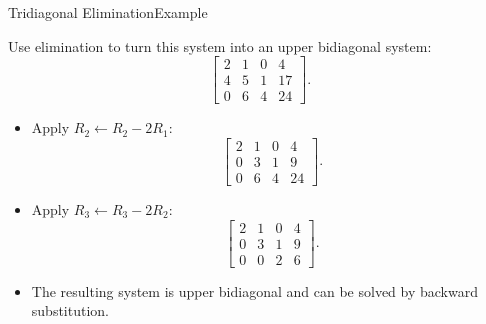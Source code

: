 \documentclass[10pt]{beamer}
\begin{document}
\begin{frame}{Tridiagonal Elimination}{Example}

\begin{example}
Use elimination to turn this system into an
upper bidiagonal system:
\[
\left[
\begin{array}{rrr|r}
    2&1&0&4\\
    4&5&1&17\\
    0&6&4&24
\end{array}
\right].
\]
\end{example}

\begin{itemize}
    \item<2-> Apply $R_2\leftarrow R_2-2R_1$:
    \[
    \left[
    \begin{array}{rrr|r}
        2&1&0&4\\
        0&3&1&9\\
        0&6&4&24
    \end{array}
    \right].
    \]

    \item<3-> Apply $R_3\leftarrow R_3-2R_2$:
    \[
    \left[
    \begin{array}{rrr|r}
        2&1&0&4\\
        0&3&1&9\\
        0&0&2&6
    \end{array}
    \right].
    \]

    \item<4-> The resulting system is upper bidiagonal
    and can be solved by backward substitution.
\end{itemize}

\end{frame}
\end{document}
